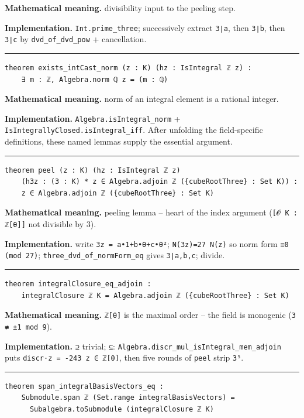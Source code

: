 \documentclass[UTF8,a4paper,11pt,fontset=fandol]{ctexart}
\theoremstyle{definition}
\newcommand{\statementsep}{\par\medskip\hrule\medskip}
\begin{document}
\noindent\textbf{Mathematical meaning.} divisibility input to the peeling step.\par
\noindent\textbf{Implementation.} \texttt{Int.\allowbreak{}prime\_\allowbreak{}three}; successively extract \texttt{3∣a}, then \texttt{3∣b}, then \texttt{3∣c} by \texttt{dvd\_\allowbreak{}of\_\allowbreak{}dvd\_\allowbreak{}pow} + cancellation.\par
\statementsep
\begin{verbatim}
theorem exists_intCast_norm (z : K) (hz : IsIntegral ℤ z) :
    ∃ m : ℤ, Algebra.norm ℚ z = (m : ℚ)
\end{verbatim}
\noindent\textbf{Mathematical meaning.} norm of an integral element is a rational integer.\par
\noindent\textbf{Implementation.} \texttt{Algebra.\allowbreak{}isIntegral\_\allowbreak{}norm} + \texttt{IsIntegrallyClosed.\allowbreak{}isIntegral\_\allowbreak{}iff}. After unfolding the field-specific definitions, these named lemmas supply the essential argument.\par
\statementsep
\begin{verbatim}
theorem peel (z : K) (hz : IsIntegral ℤ z)
    (h3z : (3 : K) * z ∈ Algebra.adjoin ℤ ({cubeRootThree} : Set K)) :
    z ∈ Algebra.adjoin ℤ ({cubeRootThree} : Set K)
\end{verbatim}
\noindent\textbf{Mathematical meaning.} peeling lemma -- heart of the index argument (\texttt{[𝓞 K : ℤ[θ]]} not divisible by 3).\par
\noindent\textbf{Implementation.} write \texttt{3z = a•1+b•θ+c•θ²}; \texttt{N(3z)=27 N(z)} so norm form \texttt{≡0 (mod 27)}; \texttt{three\_\allowbreak{}dvd\_\allowbreak{}of\_\allowbreak{}normForm\_\allowbreak{}eq} gives \texttt{3∣a,b,c}; divide.\par
\statementsep
\begin{verbatim}
theorem integralClosure_eq_adjoin :
    integralClosure ℤ K = Algebra.adjoin ℤ ({cubeRootThree} : Set K)
\end{verbatim}
\noindent\textbf{Mathematical meaning.} \texttt{ℤ[θ]} is the maximal order -- the field is monogenic (\texttt{3 ≢ ±1 mod 9}).\par
\noindent\textbf{Implementation.} \texttt{⊇} trivial; \texttt{⊆}: \texttt{Algebra.\allowbreak{}discr\_\allowbreak{}mul\_\allowbreak{}isIntegral\_\allowbreak{}mem\_\allowbreak{}adjoin} puts \texttt{discr·z = -243 z ∈ ℤ[θ]}, then five rounds of \texttt{peel} strip \texttt{3⁵}.\par
\statementsep
\begin{verbatim}
theorem span_integralBasisVectors_eq :
    Submodule.span ℤ (Set.range integralBasisVectors) =
      Subalgebra.toSubmodule (integralClosure ℤ K)
\end{verbatim}
\end{document}
